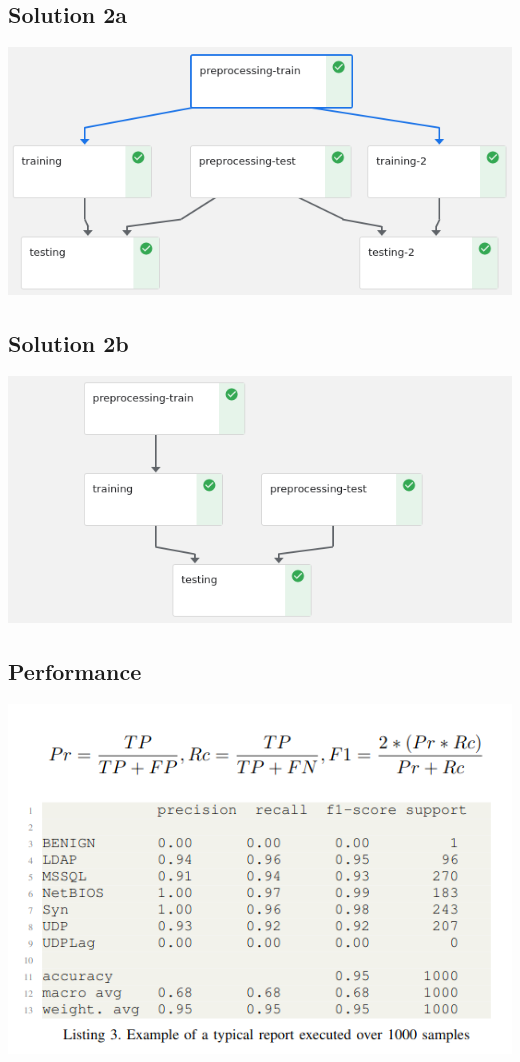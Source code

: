\documentclass[11pt]{article}
\begin{document}
\subsection*{Solution 2a}
\label{sec:org1e39bb3}
\begin{center}
\includegraphics[width=.9\linewidth]{./img/solution2a.png}
\end{center}
\subsection*{Solution 2b}
\label{sec:org8cea593}
\begin{center}
\includegraphics[width=.9\linewidth]{./img/solution2b.png}
\end{center}
\subsection*{Performance}
\label{sec:orga266aaa}
\begin{center}
\includegraphics[width=.9\linewidth]{./img/performance.png}
\end{center}
\end{document}
